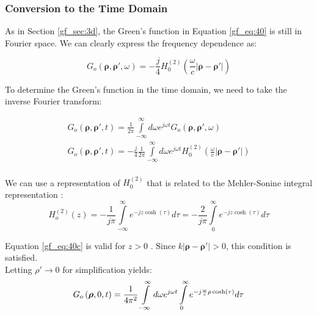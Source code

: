 \subsubsection{Conversion to the Time Domain}
As in Section \ref{gf_sec:3d}, the Green's function in Equation \ref{gf_eq:40} is still in Fourier space. We can clearly express the frequency dependence as:

\begin{equation}
G_o\left(\boldsymbol{\rho},\boldsymbol{\rho}',\omega\right) = -\frac{j}{4}H_0^{(2)}\left(\frac{\omega}{c}|\boldsymbol{\rho} - \boldsymbol{\rho}' | \right)
\label{gf_eq:40a}
\end{equation}
\renewcommand{\baselinestretch}{2} \small\normalsize

To determine the Green's function in the time domain, we need to take the inverse Fourier transform:

\begin{equation}
\begin{gathered}
G_o\left(\boldsymbol{\rho},\boldsymbol{\rho}',t\right) = \frac{1}{2\pi}\int\limits_{-\infty}^{\infty}d\omega e^{j\omega t}G_o\left(\boldsymbol{\rho},\boldsymbol{\rho}',\omega\right) \\
G_o\left(\boldsymbol{\rho},\boldsymbol{\rho}',t\right) = -\frac{j}{4}\frac{1}{2\pi}\int\limits_{-\infty}^{\infty}d\omega e^{j\omega t} H_0^{(2)}\left(\frac{\omega}{c}|\boldsymbol{\rho} - \boldsymbol{\rho}' | \right)\\
\end{gathered}
\label{gf_eq:40b}
\end{equation}
\renewcommand{\baselinestretch}{2} \small\normalsize

We can use a representation of $H_0^{(2)}$ that is related to the Mehler-Sonine integral representation \cite{nist_handbook}:
\begin{equation}
H_o^{(2)}\left(z\right) = -\frac{1}{j\pi}\int\limits_{-\infty}^{\infty}e^{-jz\cosh(\tau)}d\tau = -\frac{2}{j\pi}\int\limits_{0}^{\infty}e^{-jz\cosh(\tau)}d\tau
\label{gf_eq:40c}
\end{equation}
\renewcommand{\baselinestretch}{2} \small\normalsize

\noindent Equation \ref{gf_eq:40c} is valid for $z>0$ . Since $k| \boldsymbol{\rho} - \boldsymbol{\rho}'| > 0$, this condition is satisfied. \\

\noindent Letting $\rho' \rightarrow 0$ for simplification yields:
\begin{equation}
G_o\left(\boldsymbol{\rho},0,t\right) = \frac{1}{4\pi^2}\int\limits_{-\infty}^{\infty}d\omega e^{j\omega t} \int\limits_{0}^{\infty}e^{-j\frac{\omega}{c}\rho\cosh(\tau)}d\tau\\
\label{gf_eq:40d}
\end{equation}
\renewcommand{\baselinestretch}{2} \small\normalsize

